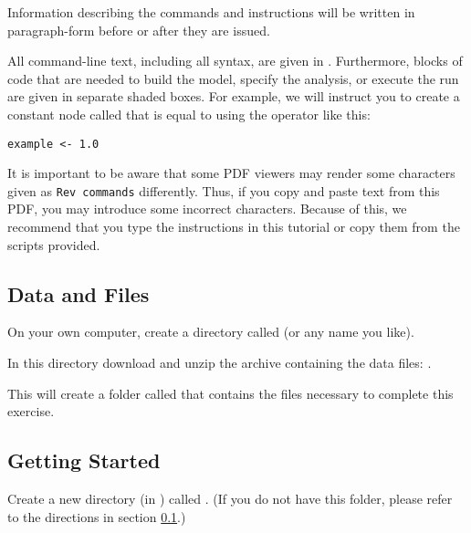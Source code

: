 Information describing the commands and instructions will be written in paragraph-form before or after they are issued.

All command-line text, including all \Rev syntax, are given in . 
Furthermore, blocks of \Rev code that are needed to build the model, specify the analysis, or execute the run are given in separate shaded boxes.
For example, we will instruct you to create a constant node called  that is equal to  using the \cl{<-} operator like this:
{\tt \begin{snugshade*}
\begin{lstlisting}
example <- 1.0
\end{lstlisting}
\end{snugshade*}
}

It is important to be aware that some PDF viewers may render some characters given as \colorbox{shadecolor}{\tt{Rev commands}} differently. 
Thus, if you copy and paste text from this PDF, you may introduce some incorrect characters. 
Because of this, we recommend that you type the instructions in this tutorial or copy them from the scripts provided. 


\medskip
\subsection{Data and Files}\label{subsect:Exercise-DataFiles}

{\begin{framed}
On your own computer, create a directory called {\textcolor{red}{}} (or any name you like). 

In this directory download and unzip the archive containing the data files: \href{https://github.com/revbayes/revbayes_tutorial/tree/master/RB_Discrete_Morphology_Tutorial/data.zip}{}.

This will create a folder called  that contains the files necessary to complete this exercise.
\end{framed}}


\bigskip
\subsection{Getting Started}\label{subsect:Exercise-GetStart}

{\begin{framed}
Create a new directory (in ) called {\textcolor{red}{}}. (If you do not have this folder, please refer to the directions in section \ref{subsect:Exercise-DataFiles}.)
\end{framed}}

